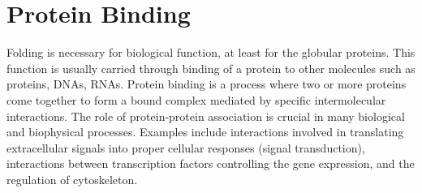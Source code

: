 \documentclass[../talant.diss.submit.tex]{subfiles}
\begin{document}
%
\section{\textbf{Protein Binding}}\label{sect:one_three}
%

Folding is necessary for biological function, at least for the globular
proteins.  This function is usually carried through binding of a protein to
other molecules such as proteins, DNAs,
RNAs. %
Protein binding is a process where two or more proteins come together to form a
bound complex mediated by specific intermolecular interactions.  The role of
protein-protein association is crucial in many biological and biophysical
processes. Examples include interactions involved in translating extracellular
signals into proper cellular responses (signal transduction\cite{boriack:98s}),
interactions between transcription factors controlling the gene
expression\cite{andel:99t}, and the regulation of cytoskeleton\cite{welch:99w}.


\end{document}
